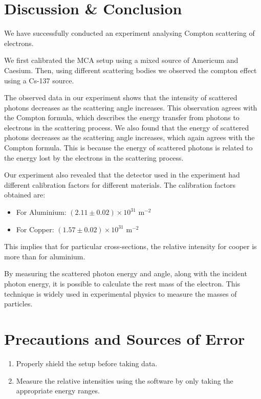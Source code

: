 \section{Discussion \& Conclusion}

We have successfully conducted an experiment analysing Compton scattering of electrons.

We first calibrated the MCA setup using a mixed source of Americum and Caesium. Then, using different scattering bodies we observed the compton effect using a Cs-137 source.

The observed data in our experiment shows that the intensity of scattered photons decreases as the scattering angle increases. This observation agrees with the Compton formula, which describes the energy transfer from photons to electrons in the scattering process.
We also found that the energy of scattered photons decreases as the scattering angle increases, which again agrees with the Compton formula. This is because the energy of scattered photons is related to the energy lost by the electrons in the scattering process.

Our experiment also revealed that the detector used in the experiment had different calibration factors for different materials. The calibration factors obtained are:\\

\begin{itemize}
    \item For Aluminium: $(2.11 \pm 0.02)\times 10^{31}$ m$^{-2}$
    \item For Copper: $(1.57 \pm 0.02) \times 10^{31}$ m$^{-2}$\\
\end{itemize}

This implies that for particular cross-sections, the relative intensity for cooper is more than for aluminium.

By measuring the scattered photon energy and angle, along with the incident photon energy, it is possible to calculate the rest mass of the electron. This technique is widely used in experimental physics to measure the masses of particles.

\section{Precautions and Sources of Error}

\begin{enumerate}
    \item Properly shield the setup before taking data.
    \item Measure the relative intensities using the software by only taking the appropriate energy ranges.
\end{enumerate}